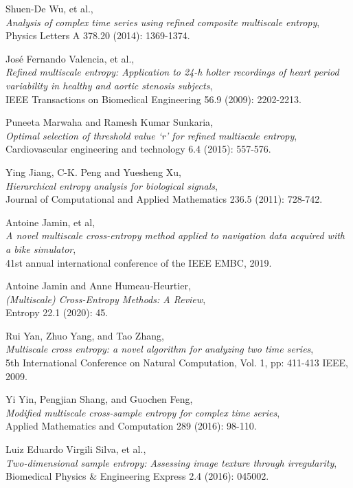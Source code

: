 \documentclass[12pt, a4paper, titlepage, openany]{book}
\begin{document}
\begin{thebibliography}{9}
Shuen-De Wu, et al.,\\
\emph{Analysis of complex time series using refined composite multiscale entropy},\\
Physics Letters A 378.20 (2014): 1369-1374.

José Fernando Valencia, et al.,\\
\emph{Refined multiscale entropy: Application to 24-h holter recordings of heart period variability in healthy and aortic stenosis subjects},\\
IEEE Transactions on Biomedical Engineering 56.9 (2009): 2202-2213.

Puneeta Marwaha and Ramesh Kumar Sunkaria,\\
\emph{Optimal selection of threshold value ‘r’ for refined multiscale  entropy},\\
Cardiovascular engineering and technology  6.4 (2015): 557-576.

Ying Jiang, C-K. Peng and Yuesheng Xu,\\
\emph{Hierarchical entropy analysis for biological signals},\\
Journal of Computational and Applied Mathematics  236.5 (2011): 728-742.

Antoine Jamin, et al,\\
\emph{A novel multiscale cross-entropy method applied to navigation data acquired with a bike simulator},\\
41st annual international conference of the IEEE EMBC, 2019.

Antoine Jamin and Anne Humeau-Heurtier,\\
\emph{(Multiscale) Cross-Entropy Methods: A Review},\\
Entropy 22.1 (2020): 45.

Rui Yan, Zhuo Yang, and Tao Zhang,\\
\emph{Multiscale cross entropy: a novel algorithm for analyzing two time series},\\
5th International Conference on Natural Computation, Vol. 1, pp: 411-413 IEEE, 2009.

Yi Yin, Pengjian Shang, and Guochen Feng,\\ 
\emph{Modified multiscale cross-sample entropy for complex time series},\\
Applied Mathematics and Computation 289 (2016): 98-110.

Luiz Eduardo Virgili Silva, et al.,\\
\emph{Two-dimensional sample entropy: Assessing image texture through irregularity},
Biomedical Physics \& Engineering Express 2.4 (2016): 045002.


\end{thebibliography}
\end{document}
